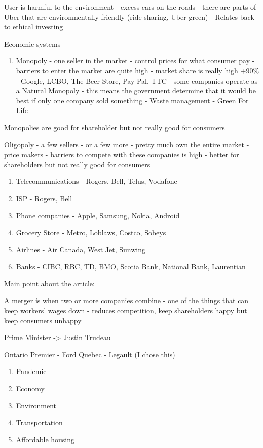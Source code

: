 \documentclass[11pt]{article}
\begin{document}
User is harmful to the environment - excess cars on the roads - there are parts of Uber that are environmentally friendly (ride sharing, Uber green) - Relates back to ethical investing

Economic systems

\begin{enumerate}
    \item Monopoly - one seller in the market - control prices for what consumer pay - barriers to enter the market are quite high - market share is really high +90\% - Google, LCBO, The Beer Store, Pay-Pal, TTC - some companies operate as a Natural Monopoly - this means the government determine that it would be best if only one company sold something - Waste management - Green For Life
\end{enumerate}

Monopolies are good for shareholder but not really good for consumers

Oligopoly - a few sellers - or a few more - pretty much own the entire market - price makers - barriers to compete with these companies is high - better for shareholders but not really good for consumers

\begin{enumerate}
    \item Telecommunications - Rogers, Bell, Telus, Vodafone
    \item ISP - Rogers, Bell
    \item Phone companies - Apple, Samsung, Nokia, Android
    \item Grocery Store - Metro, Loblaws, Costco, Sobeys
    \item Airlines - Air Canada, West Jet, Sunwing
    \item Banks - CIBC, RBC, TD, BMO, Scotia Bank, National Bank, Laurentian
\end{enumerate}

Main point about the article:

A merger is when two or more companies combine - one of the things that can keep workers' wages down - reduces competition, keep shareholders happy but keep consumers unhappy

Prime Minister -> Justin Trudeau

Ontario Premier - Ford
Quebec - Legault (I chose this)


\begin{enumerate}
    \item Pandemic
    \item Economy
    \item Environment
    \item Transportation
    \item Affordable housing
\end{enumerate}
\end{document}

